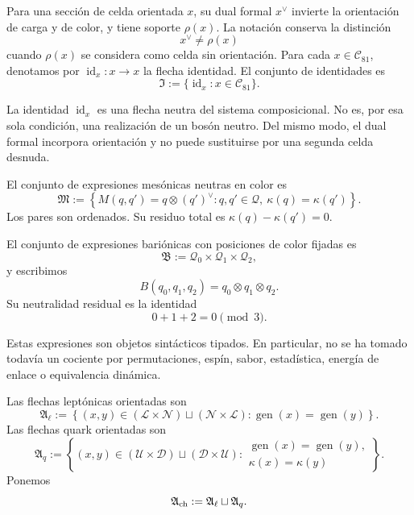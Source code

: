 \begin{definition}
\label{def:dual-identidad-composicional}
Para una sección de celda orientada \(x\), su dual formal \(x^\vee\) invierte
la orientación de carga y de color, y tiene soporte \(\rho(x)\). La
notación conserva la distinción
\[
 x^\vee\ne \rho(x)
\]
cuando \(\rho(x)\) se considera como celda sin orientación. Para cada
\(x\in\mathcal C_{81}\), denotamos por
\(\operatorname{id}_x:x\to x\) la flecha identidad. El conjunto de
identidades es
\[
 \mathfrak I
 :=\{\operatorname{id}_x:x\in\mathcal C_{81}\}.
\]
\end{definition}

La identidad \(\operatorname{id}_x\) es una flecha neutra del sistema
composicional.
No es, por esa sola condición, una realización de un bosón neutro. Del mismo
modo, el dual formal incorpora orientación y no puede sustituirse por una
segunda celda desnuda.

\begin{definition}
\label{def:expresiones-mesonicas-barionicas}
El conjunto de expresiones mesónicas neutras en color es
\[
 \mathfrak M
 :=
 \left\{
   M(q,q')=q\otimes{(q')}^\vee:
   q,q'\in\mathcal Q,\ \kappa(q)=\kappa(q')
 \right\}.
\]
Los pares son ordenados. Su residuo total es
\(\kappa(q)-\kappa(q')=0\).

El conjunto de expresiones bariónicas con posiciones de color fijadas es
\[
 \mathfrak B
 :=
 \mathcal Q_0\times\mathcal Q_1\times\mathcal Q_2,
\]
y escribimos
\[
 B(q_0,q_1,q_2)=q_0\otimes q_1\otimes q_2.
\]
Su neutralidad residual es la identidad
\[
 0+1+2=0\pmod3.
\]
\end{definition}

Estas expresiones son objetos sintácticos tipados. En particular, no se ha
tomado todavía un cociente por permutaciones, espín, sabor, estadística,
energía de enlace o equivalencia dinámica.

\begin{definition}
\label{def:flechas-cargadas-compatibles}
Las flechas leptónicas orientadas son
\[
 \mathfrak A_\ell
 :=
 \left\{
 (x,y)\in
   (\mathcal L\times\mathcal N)
   \sqcup
   (\mathcal N\times\mathcal L):
 \operatorname{gen}(x)=\operatorname{gen}(y)
 \right\}.
\]
Las flechas quark orientadas son
\[
 \mathfrak A_q
 :=
 \left\{
 (x,y)\in
   (\mathcal U\times\mathcal D)
   \sqcup
   (\mathcal D\times\mathcal U):
 \begin{array}{l}
 \operatorname{gen}(x)=\operatorname{gen}(y),\\[-2pt]
 \kappa(x)=\kappa(y)
 \end{array}
 \right\}.
\]
Ponemos
\[
 \mathfrak A_{\rm ch}:=\mathfrak A_\ell\sqcup\mathfrak A_q.
\]
\end{definition}

